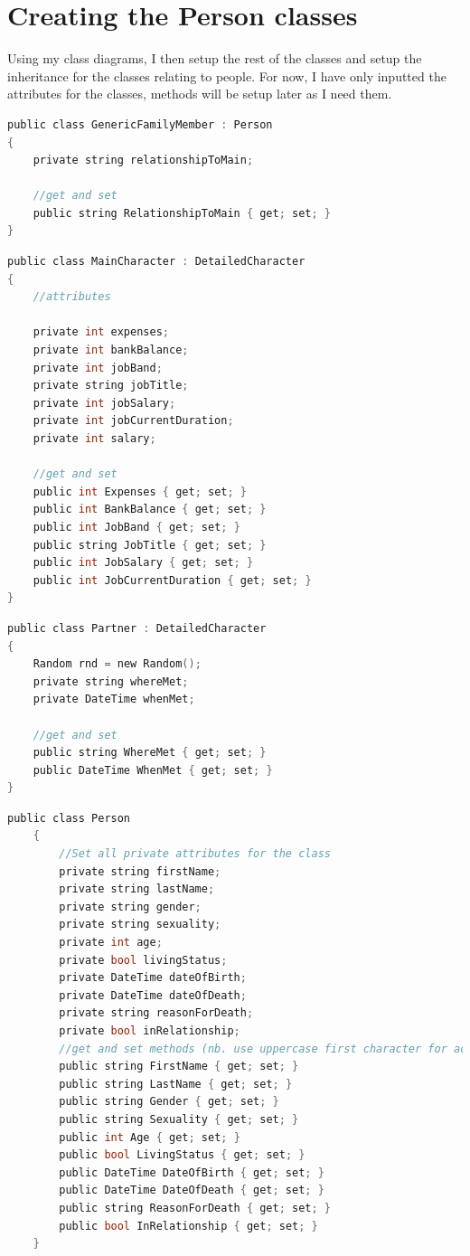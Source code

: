 \section{Creating the Person classes}
Using my class diagrams, I then setup the rest of the classes and setup the inheritance for the classes relating to people. For now, I have only inputted the attributes for the classes, methods will be setup later as I need them.
\begin{lstlisting}[language=c, style=csharp, caption=GenericFamilyMember class creation]
 public class GenericFamilyMember : Person
{
    private string relationshipToMain;

    //get and set
    public string RelationshipToMain { get; set; }
}
\end{lstlisting}
\begin{lstlisting}[language=c, style=csharp, caption=MainCharacter class creation]
public class MainCharacter : DetailedCharacter
{
    //attributes

    private int expenses;
    private int bankBalance;
    private int jobBand;
    private string jobTitle;
    private int jobSalary;
    private int jobCurrentDuration;
    private int salary;

    //get and set
    public int Expenses { get; set; }
    public int BankBalance { get; set; }
    public int JobBand { get; set; }
    public string JobTitle { get; set; }
    public int JobSalary { get; set; }
    public int JobCurrentDuration { get; set; }
}
\end{lstlisting}
\begin{lstlisting}[language=c, style=csharp, caption=Partner class creation]
public class Partner : DetailedCharacter
{
    Random rnd = new Random();
    private string whereMet;
    private DateTime whenMet;

    //get and set
    public string WhereMet { get; set; }
    public DateTime WhenMet { get; set; }
}
\end{lstlisting}
\begin{lstlisting}[language=c, style=csharp, caption=Person class creation]
public class Person
    {
        //Set all private attributes for the class
        private string firstName;
        private string lastName;
        private string gender;
        private string sexuality;
        private int age;
        private bool livingStatus;
        private DateTime dateOfBirth;
        private DateTime dateOfDeath;
        private string reasonForDeath;
        private bool inRelationship;
        //get and set methods (nb. use uppercase first character for accessable get/set)
        public string FirstName { get; set; }
        public string LastName { get; set; }
        public string Gender { get; set; }
        public string Sexuality { get; set; }
        public int Age { get; set; }
        public bool LivingStatus { get; set; }
        public DateTime DateOfBirth { get; set; }
        public DateTime DateOfDeath { get; set; }
        public string ReasonForDeath { get; set; }
        public bool InRelationship { get; set; }
    }
\end{lstlisting}

